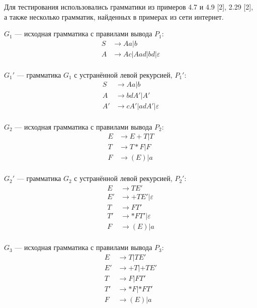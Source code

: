 \documentclass{bmstu-gost-7-32}
\begin{document}
Для тестирования использовались грамматики из примеров 4.7 и 4.9 [2], 2.29 [2], а также несколько грамматик, найденных в примерах из сети интернет.

$G_1$ — исходная грамматика с правилами вывода $P_1$:
\begin{equation}
	\begin{aligned}
		S &\to Aa | b \\
		A &\to Ac | Aad | bd | \varepsilon \\
	\end{aligned}
\end{equation}

$G_1'$ — грамматика $G_1$ с устранённой левой рекурсией, $P_1'$:
\begin{equation}
	\begin{aligned}
		S &\to Aa | b \\
		A &\to bdA' | A' \\
		A' &\to cA' | adA' | \varepsilon \\
	\end{aligned}
\end{equation}

$G_2$ — исходная грамматика с правилами вывода $P_2$:
\begin{equation}
	\begin{aligned}
		E &\to E + T | T \\
		T &\to T * F | F \\
		F &\to (E) | a \\
	\end{aligned}
\end{equation}

$G_2'$ — грамматика $G_2$ с устранённой левой рекурсией, $P_2'$:
\begin{equation}
	\begin{aligned}
		E &\to TE' \\
		E' &\to +TE' | \varepsilon \\
		T &\to FT' \\
		T' &\to *FT' | \varepsilon \\
		F &\to (E) | a \\
	\end{aligned}
\end{equation}

$G_3$ — исходная грамматика с правилами вывода $P_3$:
\begin{equation}
	\begin{aligned}
		E &\to T | TE' \\
		E' &\to +T | +TE' \\
		T &\to F | FT' \\
		T' &\to *F | *FT' \\
		F &\to (E) | a \\
	\end{aligned}
\end{equation}
\end{document}
